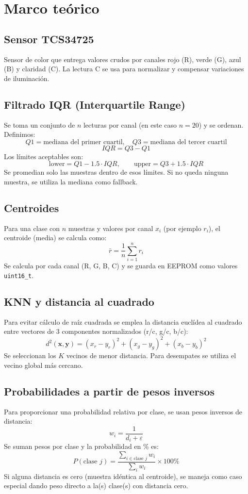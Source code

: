 \documentclass[conference]{IEEEtran}
\begin{document}
\section{Marco teórico}
\subsection{Sensor TCS34725}
Sensor de color que entrega valores crudos por canales rojo (R), verde (G), azul (B) y claridad (C). La lectura C se usa para normalizar y compensar variaciones de iluminación.

\subsection{Filtrado IQR (Interquartile Range)}
Se toma un conjunto de $n$ lecturas por canal (en este caso $n=20$) y se ordenan. Definimos:
\[
Q1 = \text{mediana del primer cuartil}, \quad Q3 = \text{mediana del tercer cuartil}
\]
\[
IQR = Q3 - Q1
\]
Los límites aceptables son:
\[
\text{lower} = Q1 - 1.5 \cdot IQR,\qquad \text{upper} = Q3 + 1.5 \cdot IQR
\]
Se promedian solo las muestras dentro de esos límites. Si no queda ninguna muestra, se utiliza la mediana como fallback.

\subsection{Centroides}
Para una clase con $n$ muestras y valores por canal $x_i$ (por ejemplo $r_i$), el centroide (media) se calcula como:
\[
\bar{r} = \frac{1}{n}\sum_{i=1}^{n} r_i
\]
Se calcula por cada canal (R, G, B, C) y se guarda en EEPROM como valores \texttt{uint16\_t}.

\subsection{KNN y distancia al cuadrado}
Para evitar cálculo de raíz cuadrada se emplea la distancia euclídea al cuadrado entre vectores de 3 componentes normalizados (r/c, g/c, b/c):
\[
d^2(\mathbf{x},\mathbf{y}) = (x_r - y_r)^2 + (x_g - y_g)^2 + (x_b - y_b)^2
\]
Se seleccionan los $K$ vecinos de menor distancia. Para desempates se utiliza el vecino global más cercano.

\subsection{Probabilidades a partir de pesos inversos}
Para proporcionar una probabilidad relativa por clase, se usan pesos inversos de distancia:
\[
w_i = \frac{1}{d_i + \varepsilon}
\]
Se suman pesos por clase y la probabilidad en \% es:
\[
P(\text{clase } j) = \frac{\sum_{i\in \text{clase } j} w_i}{\sum_{i} w_i}\times 100\%
\]
Si alguna distancia es cero (muestra idéntica al centroide), se maneja como caso especial dando peso directo a la(s) clase(s) con distancia cero.
\end{document}
